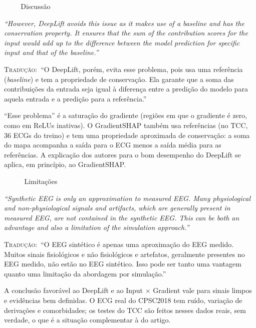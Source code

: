 \documentclass[11pt,a4paper]{article}
\newcommand{\pagechip}[1]{{\setlength{\fboxsep}{1.5pt}\colorbox{cAcc}{\textcolor{white}{\scriptsize\texttt{#1}}}}}
\newenvironment{origquote}{\par\itshape\small}{\par}
\newenvironment{tradquote}{\par\small\textsc{Tradução:}\ }{\par}
\newcommand{\explab}[1]{\par\smallskip{\small\color{cAcc}\textbf{\MakeUppercase{#1}}}\par}
\begin{document}
\begin{citacard}{\pagechip{p. 9} Discussão}
\begin{origquote}“However, DeepLift avoids this issue as it makes use of a baseline and has the conservation property. It ensures that the sum of the contribution scores for the input would add up to the difference between the model prediction for specific input and that of the baseline.”\end{origquote}
\begin{tradquote}“O DeepLift, porém, evita esse problema, pois usa uma referência (\textit{baseline}) e tem a propriedade de conservação. Ela garante que a soma das contribuições da entrada seja igual à diferença entre a predição do modelo para aquela entrada e a predição para a referência.”\end{tradquote}
\explab{Explicação}
“Esse problema” é a saturação do gradiente (regiões em que o gradiente é zero, como em ReLUs inativas). O GradientSHAP também usa referências (no TCC, 36 ECGs do treino) e tem uma propriedade aproximada de conservação: a soma do mapa acompanha a saída para o ECG menos a saída média para as referências. A explicação dos autores para o bom desempenho do DeepLift se aplica, em princípio, ao GradientSHAP.
\end{citacard}

\begin{citacard}{\pagechip{p. 10} Limitações}
\begin{origquote}“Synthetic EEG is only an approximation to measured EEG. Many physiological and non-physiological signals and artifacts, which are generally present in measured EEG, are not contained in the synthetic EEG. This can be both an advantage and also a limitation of the simulation approach.”\end{origquote}
\begin{tradquote}“O EEG sintético é apenas uma aproximação do EEG medido. Muitos sinais fisiológicos e não fisiológicos e artefatos, geralmente presentes no EEG medido, não estão no EEG sintético. Isso pode ser tanto uma vantagem quanto uma limitação da abordagem por simulação.”\end{tradquote}
\explab{Explicação}
A conclusão favorável ao DeepLift e ao Input $\times$ Gradient vale para sinais limpos e evidências bem definidas. O ECG real do CPSC2018 tem ruído, variação de derivações e comorbidades; os testes do TCC são feitos nesses dados reais, sem verdade, o que é a situação complementar à do artigo.
\end{citacard}
\end{document}
